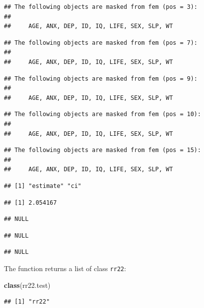 \documentclass[12pt,]{book}
\newenvironment{Shaded}{\begin{snugshade}}{\end{snugshade}}
\newcommand{\KeywordTok}[1]{\textcolor[rgb]{0.13,0.29,0.53}{\textbf{#1}}}
\newcommand{\NormalTok}[1]{#1}
\theoremstyle{definition}
\theoremstyle{definition}
\theoremstyle{definition}
\theoremstyle{remark}
\begin{document}
\begin{verbatim}
## The following objects are masked from fem (pos = 3):
## 
##     AGE, ANX, DEP, ID, IQ, LIFE, SEX, SLP, WT
\end{verbatim}

\begin{verbatim}
## The following objects are masked from fem (pos = 7):
## 
##     AGE, ANX, DEP, ID, IQ, LIFE, SEX, SLP, WT
\end{verbatim}

\begin{verbatim}
## The following objects are masked from fem (pos = 9):
## 
##     AGE, ANX, DEP, ID, IQ, LIFE, SEX, SLP, WT
\end{verbatim}

\begin{verbatim}
## The following objects are masked from fem (pos = 10):
## 
##     AGE, ANX, DEP, ID, IQ, LIFE, SEX, SLP, WT
\end{verbatim}

\begin{verbatim}
## The following objects are masked from fem (pos = 15):
## 
##     AGE, ANX, DEP, ID, IQ, LIFE, SEX, SLP, WT
\end{verbatim}

\begin{verbatim}
## [1] "estimate" "ci"
\end{verbatim}

\begin{verbatim}
## [1] 2.054167
\end{verbatim}

\begin{verbatim}
## NULL
\end{verbatim}

\begin{verbatim}
## NULL
\end{verbatim}

\begin{verbatim}
## NULL
\end{verbatim}

The function returns a list of class \texttt{rr22}:

\begin{Shaded}
\begin{Highlighting}[]
\KeywordTok{class}\NormalTok{(rr22.test)}
\end{Highlighting}
\end{Shaded}

\begin{verbatim}
## [1] "rr22"
\end{verbatim}
\end{document}

